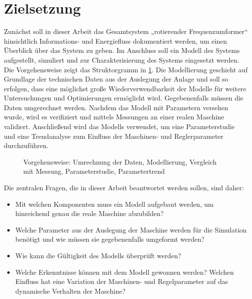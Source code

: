\section{Zielsetzung}
\label{sec:Zielsetzung}
Zunächst soll in dieser Arbeit das Gesamtsystem „rotierender Frequenzumformer“ hinsichtlich Informations- und Energiefluss dokumentiert werden, um einen Überblick über das System zu geben. Im Anschluss soll ein Modell des Systems aufgestellt, simuliert und zur Charakterisierung des Systems eingesetzt werden. Die Vorgehensweise zeigt das Struktorgramm in \cref{fig:StrukturArbeit}.   Die Modellierung geschieht auf Grundlage der technischen Daten aus der Auslegung der Anlage und soll so erfolgen, dass eine möglichst große Wiederverwendbarkeit der Modelle für weitere Untersuchungen und Optimierungen ermöglicht wird.  Gegebenenfalls müssen die Daten umgerechnet werden. Nachdem das Modell mit Parametern versehen wurde, wird es verifiziert und mittels Messungen an einer realen Maschine validiert. Anschließend wird das Modells verwendet, um eine Parameterstudie und eine Trendanalyse zum Einfluss der Maschinen- und Reglerparameter durchzuführen. 
\begin{figure}
	\centering
	
	\caption{Vorgehensweise: Umrechnung der Daten, Modellierung, Vergleich mit Messung, Parameterstudie, Parametertrend}
	\label{fig:StrukturArbeit}
\end{figure}
Die zentralen Fragen, die in dieser Arbeit beantwortet werden sollen, sind daher:
\begin{itemize}
\item Mit welchen Komponenten muss ein Modell aufgebaut werden, um hinreichend genau die reale Maschine abzubilden?
\item Welche Parameter aus der Auslegung der Maschine werden für die Simulation benötigt und wie müssen sie gegebenenfalls umgeformt werden?
\item Wie kann die Gültigkeit des Modells überprüft werden?
\item Welche Erkenntnisse können mit dem Modell gewonnen werden? Welchen Einfluss hat eine Variation der Maschinen- und Regelparameter auf das dynamische Verhalten der Maschine?
\end{itemize}

